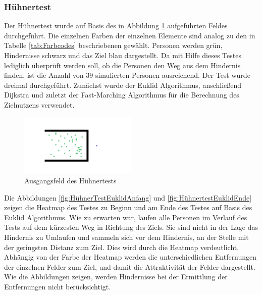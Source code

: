 \subsubsection{Hühnertest}
Der Hühnertest wurde auf Basis des in Abbildung \ref{fig:HühnertestMap} aufgeführten Feldes durchgeführt. Die einzelnen Farben der einzelnen Elemente sind analog zu den in Tabelle \ref{tab:Farbcodes} beschriebenen gewählt. Personen werden grün, Hindernisse schwarz und das Ziel blau dargestellt. Da mit Hilfe dieses Testes lediglich überprüft werden soll, ob die Personen den Weg aus dem Hindernis finden, ist die Anzahl von $39$ simulierten Personen ausreichend. Der Test wurde dreimal durchgeführt. Zunächst wurde der Euklid Algorithmus, anschließend Dijkstra und zuletzt der Fast-Marching Algorithmus für die Berechnung des Zielnutzens verwendet.

\begin{figure}[htpb]
	\centering
	\includegraphics[width=0.5\textwidth]{abbildungen/HuehnertestMap.png}
	\caption{Ausgangsfeld des Hühnertests}
	\label{fig:HühnertestMap}
\end{figure}

Die Abbildungen \ref{fig:HühnerTestEuklidAnfang} und \ref{fig:HühnertestEuklidEnde} zeigen die Heatmap des Testes zu Beginn und am Ende des Testes auf Basis des Euklid Algorithmus. Wie zu erwarten war, laufen alle Personen im Verlauf des Tests auf dem kürzesten Weg in Richtung des Ziels. Sie sind nicht in der Lage das Hindernis zu Umlaufen und sammeln sich vor dem Hindernis, an der Stelle mit der geringsten Distanz zum Ziel. Dies wird durch die Heatmap verdeutlicht. Abhängig von der Farbe der Heatmap werden die unterschiedlichen Entfernungen der einzelnen Felder zum Ziel, und damit die Attraktivität der Felder dargestellt. Wie die Abbildungen zeigen, werden Hindernisse bei der Ermittlung der Entfernungen nicht berücksichtigt.
 
